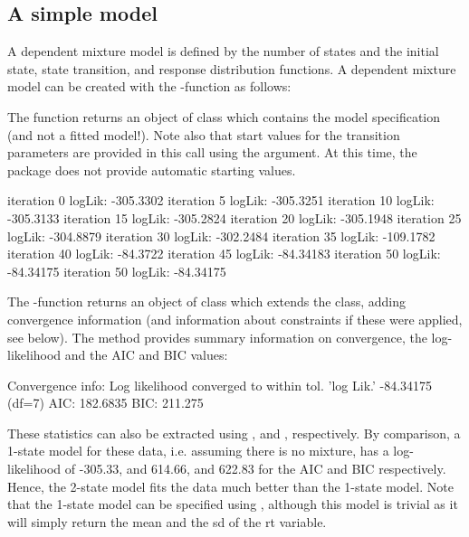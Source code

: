 \documentclass[article]{jss}
\begin{document}
\subsection{A simple model}

A dependent mixture model is defined by the number of states and the
initial state, state transition, and response distribution functions.
A dependent mixture model can be created with the
-function as follows:


The  function returns an object of class 
which contains the model specification (and not a fitted model!).
Note also that start values for the transition parameters are provided
in this call using the  argument.  At this time, the
package does not provide automatic starting values.

\begin{Schunk}
\begin{Soutput}
iteration 0 logLik: -305.3302 
iteration 5 logLik: -305.3251 
iteration 10 logLik: -305.3133 
iteration 15 logLik: -305.2824 
iteration 20 logLik: -305.1948 
iteration 25 logLik: -304.8879 
iteration 30 logLik: -302.2484 
iteration 35 logLik: -109.1782 
iteration 40 logLik: -84.3722 
iteration 45 logLik: -84.34183 
iteration 50 logLik: -84.34175 
iteration 50 logLik: -84.34175 
\end{Soutput}
\end{Schunk}
The -function returns an object of class
 which extends the  class, adding
convergence information (and information about constraints if these
were applied, see below).  The  method provides summary
information on convergence, the log-likelihood and the AIC and BIC
values:
\begin{Schunk}
\begin{Soutput}
Convergence info: Log likelihood converged to within tol. 
'log Lik.' -84.34175 (df=7)
AIC:  182.6835 
BIC:  211.275 
\end{Soutput}
\end{Schunk}


These statistics can also be extracted using , 
and , respectively.  By comparison, a 1-state model for
these data, i.e. assuming there is no mixture, has a log-likelihood of
-305.33, and 614.66, and 622.83 for the AIC and BIC respectively.
Hence, the 2-state model fits the data much better than the 1-state
model.  Note that the 1-state model can be specified using , although this model is trivial
as it will simply return the mean and the sd of the rt variable.
\end{document}
